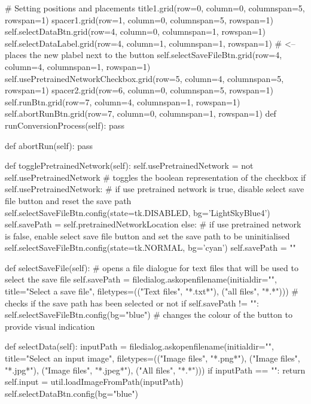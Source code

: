 \documentclass{report}
\begin{document}
\begin{python}
        # Setting positions and placements
        title1.grid(row=0, column=0, columnspan=5, rowspan=1)
        spacer1.grid(row=1, column=0, columnspan=5, rowspan=1)
        self.selectDataBtn.grid(row=4, column=0, columnspan=1, rowspan=1)
        self.selectDataLabel.grid(row=4, column=1, columnspan=1, rowspan=1)  # <-- places the new plabel next to the button
        self.selectSaveFileBtn.grid(row=4, column=4, columnspan=1, rowspan=1)
        self.usePretrainedNetworkCheckbox.grid(row=5, column=4, columnspan=5, rowspan=1)
        spacer2.grid(row=6, column=0, columnspan=5, rowspan=1)
        self.runBtn.grid(row=7, column=4, columnspan=1, rowspan=1)
        self.abortRunBtn.grid(row=7, column=0, columnspan=1, rowspan=1)
    def runConversionProcess(self):
        pass

    def abortRun(self):
        pass

    def togglePretrainedNetwork(self):
        self.usePretrainedNetwork = not self.usePretrainedNetwork  # toggles the boolean representation of the checkbox
        if self.usePretrainedNetwork:
            # if use pretrained network is true, disable select save file button and reset the save path
            self.selectSaveFileBtn.config(state=tk.DISABLED, bg='LightSkyBlue4')
            self.savePath = self.pretrainedNetworkLocation
        else:
            # if use pretrained network is false, enable select save file button and set the save path to be uninitialised
            self.selectSaveFileBtn.config(state=tk.NORMAL, bg='cyan')
            self.savePath = ""

    def selectSaveFile(self):
        # opens a file dialogue for text files that will be used to select the save file
        self.savePath = filedialog.askopenfilename(initialdir="",
                            title="Select a save file",
                            filetypes=(("Text files", "*.txt*"), ("all files", "*.*")))
        # checks if the save path has been selected or not
        if self.savePath != "":
            self.selectSaveFileBtn.config(bg="blue")  # changes the colour of the button to provide visual indication

    def selectData(self):
        inputPath = filedialog.askopenfilename(initialdir="", title="Select an input image",
                            filetypes=(("Image files", "*.png*"),
                            ("Image files", "*.jpg*"),
                            ("Image files", "*.jpeg*"),
                            ("All files", "*.*")))
        if inputPath == "":
            return
        self.input = util.loadImageFromPath(inputPath)
        self.selectDataBtn.config(bg="blue")
\end{python}
\end{document}
